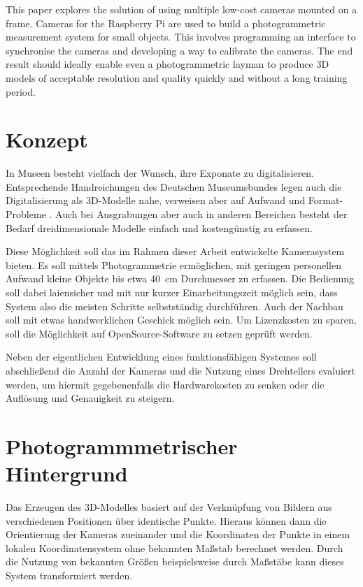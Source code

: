 \documentclass[a4paper,12pt,bibliography=totoc, listof=totoc,titlepage]{scrreprt}
\begin{document}
This paper explores the solution of using multiple low-cost cameras mounted on a frame. Cameras for the Raspberry Pi are used to build a photogrammetric measurement system for small objects. This involves programming an interface to synchronise the cameras and developing a way to calibrate the cameras. The end result should ideally enable even a photogrammetric layman to produce 3D models of acceptable resolution and quality quickly and without a long training period.

\providecommand{\citeTwo}[4]{\citep[{\citealp[#1]{#2};}][#3]{#4}}
\providecommand{\citeThree}[6]{\citep[{\citealp[#1]{#2}; \citealp[#3]{#4};}][#5]{#6}}
\providecommand{\citeFour}[8]{\citep[{\citealp[#1]{#2}; \citealp[#3]{#4}; \citealp[#5]{#6};}][#7]{#8}}

\newpage

\tableofcontents
\newpage

\setcounter{page}{1}

\chapter{Konzept}
In Museen besteht vielfach der Wunsch, ihre Exponate zu digitalisieren. Entsprechende Handreichungen des Deutschen Museumsbundes legen auch die Digitalisierung als 3D-Modelle nahe, verweisen aber auf Aufwand und Format-Probleme \citep[S. 43]{handreichung_digital}.
Auch bei Ausgrabungen aber auch in anderen Bereichen besteht der Bedarf dreidimensionale Modelle einfach und kostengünstig zu erfassen.

Diese Möglichkeit soll das im Rahmen dieser Arbeit entwickelte Kamerasystem bieten. Es soll mittels Photogrammetrie ermöglichen, mit geringen personellen Aufwand kleine Objekte bis etwa 40~cm Durchmesser zu erfassen. Die Bedienung soll dabei laiensicher und mit nur kurzer Einarbeitungszeit möglich sein, dass System also die meisten Schritte selbstständig durchführen. Auch der Nachbau soll mit etwas handwerklichen Geschick möglich sein. Um Lizenzkosten zu sparen, soll die Möglichkeit auf OpenSource-Software zu setzen geprüft werden.

Neben der eigentlichen Entwicklung eines funktionsfähigen Systemes soll abschließend die Anzahl der Kameras und die Nutzung eines Drehtellers evaluiert werden, um hiermit gegebenenfalls die Hardwarekosten zu senken oder die Auflösung und Genauigkeit zu steigern.

\chapter{Photogrammmetrischer Hintergrund}
\label{c:photogrammmetrie}
Das Erzeugen des 3D-Modelles basiert auf der Verknüpfung von Bildern aus verschiedenen Positionen über identische Punkte. Hieraus können dann die Orientierung der Kameras zueinander und die Koordinaten der Punkte in einem lokalen Koordinatensystem ohne bekannten Maßstab berechnet werden. Durch die Nutzung von bekannten Größen beispielsweise durch Maßstäbe kann dieses System transformiert werden.
\end{document}
